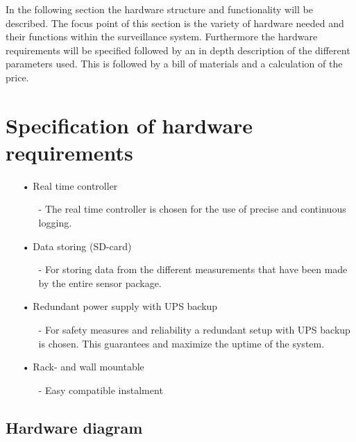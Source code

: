 In the following section the hardware structure and functionality will be described. The focus point of this section is the variety of hardware needed and their functions within the surveillance system. Furthermore the hardware requirements will be specified followed by an in depth description of the different parameters used. This is followed by a bill of materials and a calculation of the price.
\section{Specification of hardware requirements}
\begin{enumerate}
	\item[•]Real time controller
	\begin{enumerate}
		\item[-]The real time controller is chosen for the use of precise and continuous logging.
	\end{enumerate}
	\item[•]Data storing (SD-card)
	\begin{enumerate}
		\item[-]For storing data from the different measurements that have been made by the entire sensor package.
	\end{enumerate}
	\item[•]Redundant power supply with UPS backup
	\begin{enumerate}
		\item[-]For safety measures and reliability a redundant setup with UPS backup is chosen. This guarantees and maximize the uptime of the system.
	\end{enumerate}
	\item[•]Rack- and wall mountable
	\begin{enumerate}
		\item[-]Easy compatible instalment
	\end{enumerate}
\end{enumerate}
\subsection{Hardware diagram}
